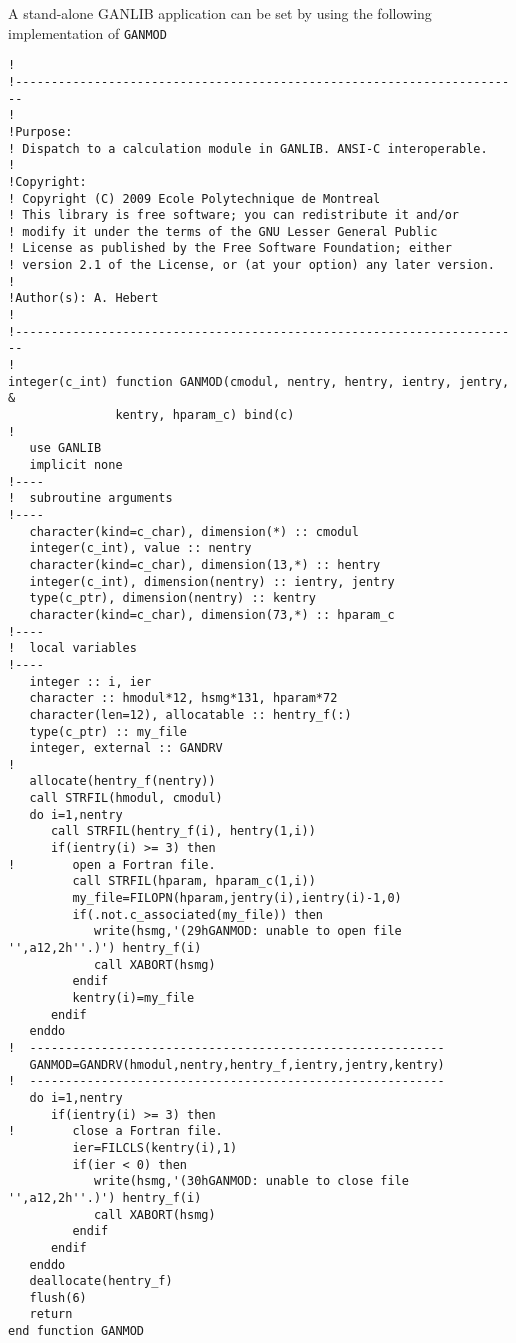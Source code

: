 A stand-alone GANLIB application can be set by using the following implementation of {\tt GANMOD}
\begin{verbatim}
!
!-----------------------------------------------------------------------
!
!Purpose:
! Dispatch to a calculation module in GANLIB. ANSI-C interoperable.
!
!Copyright:
! Copyright (C) 2009 Ecole Polytechnique de Montreal
! This library is free software; you can redistribute it and/or
! modify it under the terms of the GNU Lesser General Public
! License as published by the Free Software Foundation; either
! version 2.1 of the License, or (at your option) any later version.
!
!Author(s): A. Hebert
!
!-----------------------------------------------------------------------
!
integer(c_int) function GANMOD(cmodul, nentry, hentry, ientry, jentry, &
               kentry, hparam_c) bind(c)
!
   use GANLIB
   implicit none
!----
!  subroutine arguments
!----
   character(kind=c_char), dimension(*) :: cmodul
   integer(c_int), value :: nentry 
   character(kind=c_char), dimension(13,*) :: hentry
   integer(c_int), dimension(nentry) :: ientry, jentry
   type(c_ptr), dimension(nentry) :: kentry
   character(kind=c_char), dimension(73,*) :: hparam_c
!----
!  local variables
!----
   integer :: i, ier
   character :: hmodul*12, hsmg*131, hparam*72
   character(len=12), allocatable :: hentry_f(:)
   type(c_ptr) :: my_file
   integer, external :: GANDRV
!
   allocate(hentry_f(nentry))
   call STRFIL(hmodul, cmodul)
   do i=1,nentry
      call STRFIL(hentry_f(i), hentry(1,i))
      if(ientry(i) >= 3) then
!        open a Fortran file.
         call STRFIL(hparam, hparam_c(1,i))
         my_file=FILOPN(hparam,jentry(i),ientry(i)-1,0)
         if(.not.c_associated(my_file)) then
            write(hsmg,'(29hGANMOD: unable to open file '',a12,2h''.)') hentry_f(i)
            call XABORT(hsmg)
         endif
         kentry(i)=my_file
      endif
   enddo
!  ----------------------------------------------------------
   GANMOD=GANDRV(hmodul,nentry,hentry_f,ientry,jentry,kentry)
!  ----------------------------------------------------------
   do i=1,nentry
      if(ientry(i) >= 3) then
!        close a Fortran file.
         ier=FILCLS(kentry(i),1)
         if(ier < 0) then
            write(hsmg,'(30hGANMOD: unable to close file '',a12,2h''.)') hentry_f(i)
            call XABORT(hsmg)
         endif
      endif
   enddo
   deallocate(hentry_f)
   flush(6)
   return
end function GANMOD
\end{verbatim}

